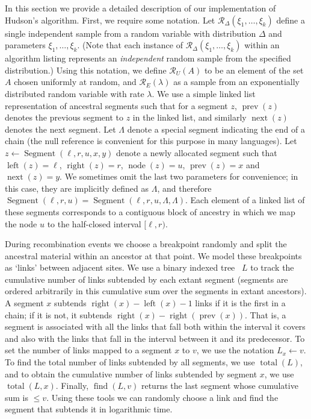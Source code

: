 \documentclass[10pt]{article}
\newcommand{\randomuniform}[0]{\mathcal{R}_U}
\newcommand{\randomexponential}[0]{\mathcal{R}_E}
\DeclareMathOperator{\segright}{right}
\DeclareMathOperator{\segleft}{left}
\DeclareMathOperator{\segnode}{node}
\DeclareMathOperator{\segnext}{next}
\DeclareMathOperator{\segprev}{prev}
\DeclareMathOperator{\segment}{Segment}
\DeclareMathOperator{\bittotal}{total}
\DeclareMathOperator{\bitfind}{find}
\begin{document}
In this section we provide a detailed description of our implementation of
Hudson's algorithm. First, we require some notation. Let
$\mathcal{R}_\Delta(\xi_1, \dots, \xi_k)$ define a single independent sample
from a random variable with distribution $\Delta$ and parameters $\xi_1,\dots,
\xi_k$. (Note that each instance of $\mathcal{R}_\Delta(\xi_1, \dots, \xi_k)$
within an algorithm listing represents an \emph{independent} random sample from
the specified distribution.) Using this notation, we define $\randomuniform(A)$
to be an element of the set $A$ chosen uniformly at random, and
$\randomexponential(\lambda)$ as a sample from an exponentially distributed
random variable with rate $\lambda$. We use a simple linked list representation
of ancestral segments such that for a segment $z$, $\segprev(z)$ denotes the
previous segment to $z$ in the linked list, and similarly $\segnext(z)$ denotes
the next segment. Let $\Lambda$ denote a special segment indicating the end of
a chain (the null reference is convenient for this purpose in many languages).
Let $z \leftarrow \segment(\ell, r, u, x, y)$ denote a newly allocated segment
such that $\segleft(z) = \ell$, $\segright(z) = r$, $\segnode(z) = u$,
$\segprev(z) = x$ and  $\segnext(z) = y$. We sometimes omit the last two parameters
for convenience; in this case, they are implicitly defined as $\Lambda$, and
therefore $\segment(\ell, r, u) = \segment(\ell, r, u, \Lambda, \Lambda)$. Each
element of a linked list of these segments corresponds to a contiguous block of
ancestry in which we map the node $u$ to the half-closed interval $[\ell, r)$.

During recombination events we choose a breakpoint randomly and split the
ancestral material within an ancestor at that point. We model these breakpoints
as `links' between adjacent sites. We use a binary indexed tree~\citep{f94,f95}
$L$ to track the cumulative number of links subtended by each extant segment
(segments are ordered arbitrarily in this cumulative sum over the segments
in extant ancestors). A segment $x$
subtends $\segright(x) - \segleft(x) - 1$ links if it is the first in a chain;
if it is not, it subtends $\segright(x) - \segright(\segprev(x))$. That is,
a segment is associated with all the links that fall both within the interval
it covers and also with the links that fall in the interval between it and
its predecessor. To set the number of links mapped to a
segment $x$ to $v$, we use the notation $L_x \leftarrow v$. To find the total
number of links subtended by all segments, we use $\bittotal(L)$, and to obtain
the cumulative number of links subtended by segment $x$, we use $\bittotal(L,
x)$.  Finally, $\bitfind(L, v)$ returns the last segment whose cumulative sum
is $\leq v$. Using these tools we can randomly choose a link and find
the segment that subtends it in logarithmic time.
\end{document}
